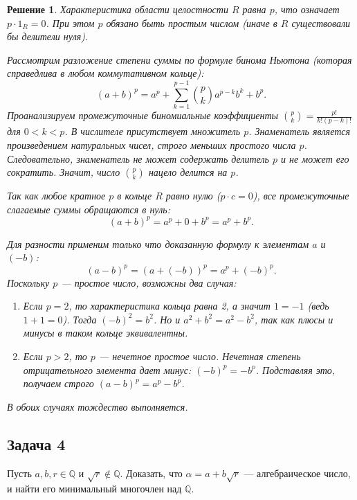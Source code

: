 \documentclass[14pt]{article}
\newtheorem*{solution}{Решение}
\begin{document}
	\begin{solution}
		Характеристика области целостности $R$ равна $p$, что означает $p \cdot 1_R = 0$. При этом $p$ обязано быть простым числом (иначе в $R$ существовали бы делители нуля).
		
		Рассмотрим разложение степени суммы по формуле бинома Ньютона (которая справедлива в любом коммутативном кольце):
		\[
		(a+b)^p = a^p + \sum_{k=1}^{p-1}\binom{p}{k}a^{p-k}b^k + b^p.
		\]
		Проанализируем промежуточные биномиальные коэффициенты $\binom{p}{k} = \frac{p!}{k!(p-k)!}$ для $0 < k < p$. В числителе присутствует множитель $p$. Знаменатель является произведением натуральных чисел, строго меньших простого числа $p$. Следовательно, знаменатель не может содержать делитель $p$ и не может его сократить. Значит, число $\binom{p}{k}$ нацело делится на $p$.
		
		Так как любое кратное $p$ в кольце $R$ равно нулю ($p \cdot c = 0$), все промежуточные слагаемые суммы обращаются в нуль:
		\[
		(a+b)^p = a^p + 0 + b^p = a^p + b^p.
		\]
		
		Для разности применим только что доказанную формулу к элементам $a$ и $(-b)$:
		\[
		(a-b)^p = (a+(-b))^p = a^p + (-b)^p.
		\]
		Поскольку $p$ — простое число, возможны два случая:
		\begin{enumerate}
			\item Если $p=2$, то характеристика кольца равна 2, а значит $1 = -1$ (ведь $1+1=0$). Тогда $(-b)^2 = b^2$. Но и $a^2 + b^2 = a^2 - b^2$, так как плюсы и минусы в таком кольце эквивалентны.
			\item Если $p > 2$, то $p$ — нечетное простое число. Нечетная степень отрицательного элемента дает минус: $(-b)^p = -b^p$. Подставляя это, получаем строго $(a-b)^p = a^p - b^p$.
		\end{enumerate}
		В обоих случаях тождество выполняется.
	\end{solution}
	
	\subsection*{Задача 4}
	Пусть $a,b,r\in \mathbb Q$ и $\sqrt r \notin \mathbb Q$. Доказать, что $\alpha = a+b\sqrt r$ — алгебраическое число, и найти его минимальный многочлен над $\mathbb Q$.
	
\end{document}
